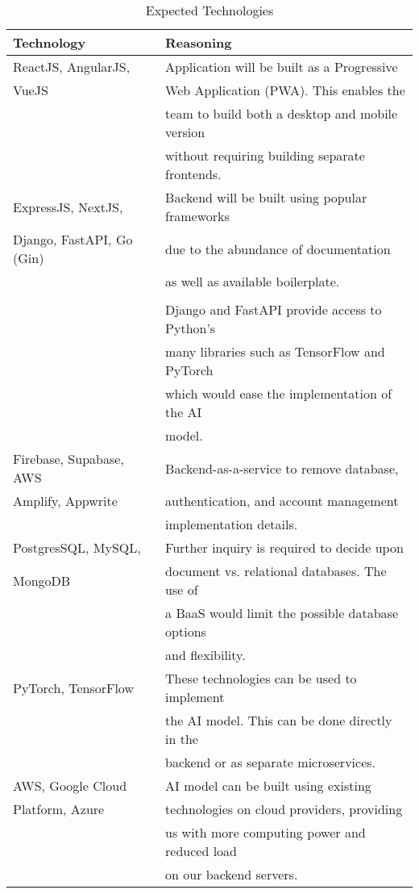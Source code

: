 \documentclass{article}
\begin{document}
\begin{table}[H]
\caption{Expected Technologies}
\label{tab:expected-tech}
\begin{tabular}{|l|l|}
\hline
\textbf{Technology} & \textbf{Reasoning} \\ \hline
ReactJS, AngularJS, & Application will be built as a Progressive \\ 
VueJS & Web Application (PWA). This enables the \\
& team to build both a desktop and mobile version  \\
& without requiring building separate frontends. \\
\hline
ExpressJS, NextJS, & Backend will be built using popular frameworks\\
Django, FastAPI, Go (Gin) & due to the abundance of documentation \\
& as well as available boilerplate. \\
& \\
& Django and FastAPI provide access to Python’s \\
& many libraries such as TensorFlow and PyTorch \\
& which would ease the implementation of the AI \\ 
& model.\\
\hline 
Firebase, Supabase, AWS & Backend-as-a-service to remove database, \\
Amplify, Appwrite & authentication, and account management  \\
& implementation details. \\
\hline
PostgresSQL, MySQL, & Further inquiry is required to decide upon \\
MongoDB &  document vs. relational databases. The use of \\
& a BaaS would limit the possible database options \\
& and flexibility. \\
\hline
PyTorch, TensorFlow & These technologies can be used to implement \\
& the AI model. This can be done directly in the  \\
& backend or as separate microservices. \\
\hline
AWS, Google Cloud & AI model can be built using existing \\ 
Platform, Azure & technologies on cloud providers, providing \\ 
& us with more computing power and reduced load \\ 
& on our backend servers. \\

\end{tabular}
\end{table}
\end{document}
